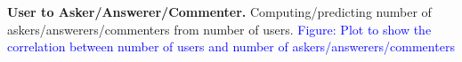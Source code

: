 \textbf{User to Asker/Answerer/Commenter.} Computing/predicting number of askers/answerers/commenters from number of users. \textcolor{blue}{Figure: Plot to show the correlation between number of users and number of askers/answerers/commenters}



